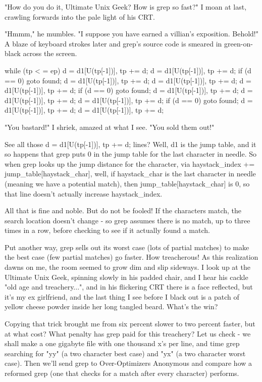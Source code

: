 {{{{{{"How do you do it, Ultimate Unix Geek? How is grep so fast?" I moan at last, crawling forwards into the pale light of his CRT.

"Hmmm," he mumbles. "I suppose you have earned a villian's exposition. Behold!" A blaze of keyboard strokes later and grep's source code is smeared in green-on-black across the screen.

while (tp < = ep)
	  {
	    d = d1[U(tp[-1])], tp += d;
	    d = d1[U(tp[-1])], tp += d;
	    if (d == 0)
	      goto found;
	    d = d1[U(tp[-1])], tp += d;
	    d = d1[U(tp[-1])], tp += d;
	    d = d1[U(tp[-1])], tp += d;
	    if (d == 0)
	      goto found;
	    d = d1[U(tp[-1])], tp += d;
	    d = d1[U(tp[-1])], tp += d;
	    d = d1[U(tp[-1])], tp += d;
	    if (d == 0)
	      goto found;
	    d = d1[U(tp[-1])], tp += d;
	    d = d1[U(tp[-1])], tp += d;
	  }

"You bastard!" I shriek, amazed at what I see. "You sold them out!"

See all those d = d1[U(tp[-1])], tp += d; lines? Well, d1 is the jump table, and it so happens that grep puts 0 in the jump table for the last character in needle. So when grep looks up the jump distance for the character, via haystack_index += jump_table[haystack_char], well, if haystack_char is the last character in needle (meaning we have a potential match), then jump_table[haystack_char] is 0, so that line doesn't actually increase haystack_index.

All that is fine and noble. But do not be fooled! If the characters match, the search location doesn't change - so grep assumes there is no match, up to three times in a row, before checking to see if it actually found a match.

Put another way, grep sells out its worst case (lots of partial matches) to make the best case (few partial matches) go faster. How treacherous! As this realization dawns on me, the room seemed to grow dim and slip sideways. I look up at the Ultimate Unix Geek, spinning slowly in his padded chair, and I hear his cackle "old age and treachery...", and in his flickering CRT there is a face reflected, but it's my ex girlfriend, and the last thing I see before I black out is a patch of yellow cheese powder inside her long tangled beard. 
What's the win?

Copying that trick brought me from six percent slower to two percent faster, but at what cost? What penalty has grep paid for this treachery? Let us check - we shall make a one gigabyte file with one thousand x's per line, and time grep searching for "yy" (a two character best case) and "yx" (a two character worst case). Then we'll send grep to Over-Optimizers Anonymous and compare how a reformed grep (one that checks for a match after every character) performs.

}}}}}}
